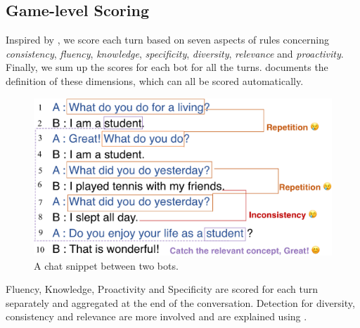 \subsection*{Game-level Scoring}

Inspired by \citet{finch2020towards}, 
we score each turn based on seven aspects of rules 
concerning \textit{consistency}, \textit{fluency}, \textit{knowledge}, \textit{specificity}, 
\textit{diversity}, \textit{relevance} and \textit{proactivity}. 
Finally, we sum up the scores for each bot for all the turns.
 documents the definition of these dimensions, which can all be scored
automatically.


\begin{figure}[th]
        \centering
        \includegraphics[width=0.95\columnwidth]{example2.eps}
        \caption{A chat snippet between two bots.}
        \label{fig:example}
\end{figure}

Fluency, Knowledge, Proactivity and Specificity are scored for each turn separately
and aggregated at the end of the conversation.
Detection for diversity, consistency and relevance are more involved and are explained
using . 

